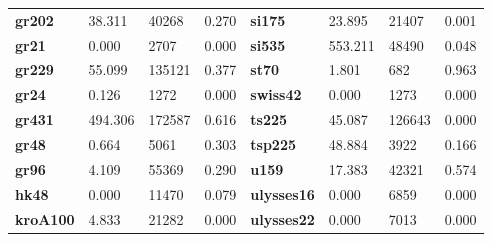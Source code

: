 \documentclass{article}
\begin{document}
\begin{table}[H]
\begin{tabular}{>{\bfseries}llll>{\bfseries}llll}
gr202 & 38.311 & 40268 & 0.270 & si175 & 23.895 & 21407 & 0.001 \\
gr21 & 0.000 & 2707 & 0.000 & si535 & 553.211 & 48490 & 0.048 \\
gr229 & 55.099 & 135121 & 0.377 & st70 & 1.801 & 682 & 0.963 \\
gr24 & 0.126 & 1272 & 0.000 & swiss42 & 0.000 & 1273 & 0.000 \\
gr431 & 494.306 & 172587 & 0.616 & ts225 & 45.087 & 126643 & 0.000 \\
gr48 & 0.664 & 5061 & 0.303 & tsp225 & 48.884 & 3922 & 0.166 \\
gr96 & 4.109 & 55369 & 0.290 & u159 & 17.383 & 42321 & 0.574 \\
hk48 & 0.000 & 11470 & 0.079 & ulysses16 & 0.000 & 6859 & 0.000 \\
kroA100 & 4.833 & 21282 & 0.000 & ulysses22 & 0.000 & 7013 & 0.000 \\
\bottomrule
\end{tabular}

\end{table}
\end{document}
